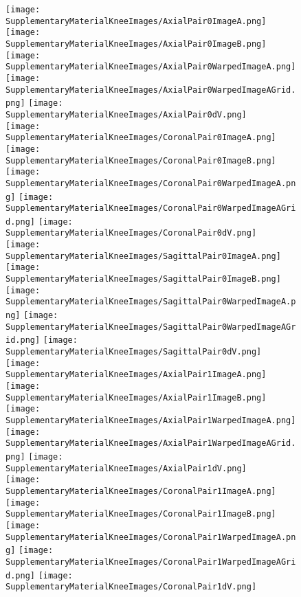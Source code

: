 \begin{figure}
    \centering
    \texttt{[image: SupplementaryMaterialKneeImages/AxialPair0ImageA.png]}
    \texttt{[image: SupplementaryMaterialKneeImages/AxialPair0ImageB.png]}
    \texttt{[image: SupplementaryMaterialKneeImages/AxialPair0WarpedImageA.png]}
    \texttt{[image: SupplementaryMaterialKneeImages/AxialPair0WarpedImageAGrid.png]}
    \texttt{[image: SupplementaryMaterialKneeImages/AxialPair0dV.png]}\\
    
    \texttt{[image: SupplementaryMaterialKneeImages/CoronalPair0ImageA.png]}
    \texttt{[image: SupplementaryMaterialKneeImages/CoronalPair0ImageB.png]}
    \texttt{[image: SupplementaryMaterialKneeImages/CoronalPair0WarpedImageA.png]}
    \texttt{[image: SupplementaryMaterialKneeImages/CoronalPair0WarpedImageAGrid.png]}
    \texttt{[image: SupplementaryMaterialKneeImages/CoronalPair0dV.png]}\\
    
    \texttt{[image: SupplementaryMaterialKneeImages/SagittalPair0ImageA.png]}
    \texttt{[image: SupplementaryMaterialKneeImages/SagittalPair0ImageB.png]}
    \texttt{[image: SupplementaryMaterialKneeImages/SagittalPair0WarpedImageA.png]}
    \texttt{[image: SupplementaryMaterialKneeImages/SagittalPair0WarpedImageAGrid.png]}
    \texttt{[image: SupplementaryMaterialKneeImages/SagittalPair0dV.png]}\\
    
    \texttt{[image: SupplementaryMaterialKneeImages/AxialPair1ImageA.png]}
    \texttt{[image: SupplementaryMaterialKneeImages/AxialPair1ImageB.png]}
    \texttt{[image: SupplementaryMaterialKneeImages/AxialPair1WarpedImageA.png]}
    \texttt{[image: SupplementaryMaterialKneeImages/AxialPair1WarpedImageAGrid.png]}
    \texttt{[image: SupplementaryMaterialKneeImages/AxialPair1dV.png]}\\
    
    \texttt{[image: SupplementaryMaterialKneeImages/CoronalPair1ImageA.png]}
    \texttt{[image: SupplementaryMaterialKneeImages/CoronalPair1ImageB.png]}
    \texttt{[image: SupplementaryMaterialKneeImages/CoronalPair1WarpedImageA.png]}
    \texttt{[image: SupplementaryMaterialKneeImages/CoronalPair1WarpedImageAGrid.png]}
    \texttt{[image: SupplementaryMaterialKneeImages/CoronalPair1dV.png]}\\
    

\end{figure}
